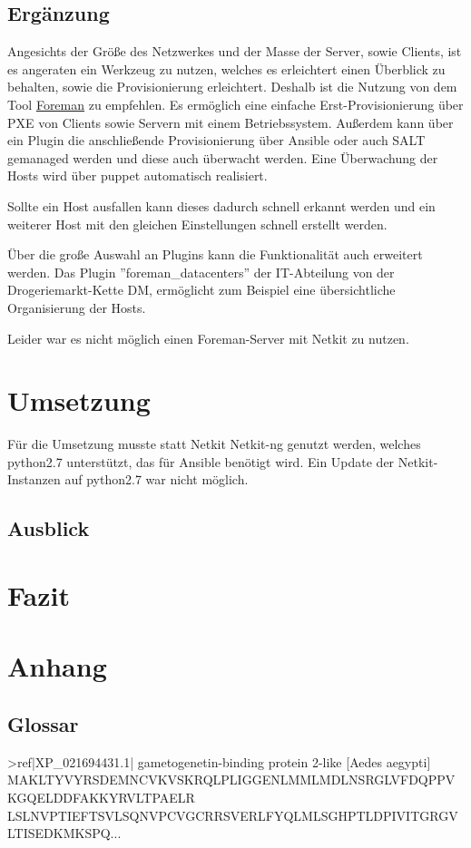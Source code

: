 \documentclass[a4paper]{article}
\newenvironment{fullgrayverb}
{\verbbox}
{\endverbbox\par\colorbox{lightgray}{\parbox{\textwidth}{\theverbbox}}\par}
\begin{document}
\subsection{Ergänzung}
Angesichts der Größe des Netzwerkes und der Masse der Server, sowie Clients, ist es angeraten ein Werkzeug zu nutzen, welches es erleichtert einen Überblick zu behalten, sowie die Provisionierung erleichtert. Deshalb ist die Nutzung von dem Tool \href{www.theforeman.org}{Foreman} zu empfehlen. Es ermöglich eine einfache Erst-Provisionierung über PXE von Clients sowie Servern mit einem Betriebssystem. Außerdem kann über ein Plugin die anschließende Provisionierung über Ansible oder auch SALT gemanaged werden und diese auch überwacht werden. Eine Überwachung der Hosts wird über puppet automatisch realisiert.

Sollte ein Host ausfallen kann dieses dadurch schnell erkannt werden und ein weiterer Host mit den gleichen Einstellungen schnell erstellt werden.

Über die große Auswahl an Plugins kann die Funktionalität auch erweitert werden. Das Plugin ''foreman\_datacenters'' der IT-Abteilung von der Drogeriemarkt-Kette DM, ermöglicht zum Beispiel eine übersichtliche Organisierung der Hosts.

Leider war es nicht möglich einen Foreman-Server mit Netkit zu nutzen.

\section{Umsetzung}

Für die Umsetzung musste statt Netkit Netkit-ng genutzt werden, welches python2.7 unterstützt, das für Ansible benötigt wird. Ein Update der Netkit-Instanzen auf python2.7 war nicht möglich.
\subsection{Ausblick}

\section{Fazit}

\newpage

\section{Anhang}
\subsection{Glossar}

\begin{fullgrayverb}
>ref|XP_021694431.1| gametogenetin-binding protein 2-like [Aedes aegypti]
MAKLTYVYRSDEMNCVKVSKRQLPLIGGENLMMLMDLNSRGLVFDQPPVKGQELDDFAKKYRVLTPAELR
LSLNVPTIEFTSVLSQNVPCVGCRRSVERLFYQLMLSGHPTLDPIVITGRGVLTISEDKMKSPQ...
\end{fullgrayverb}\\
\end{document}
